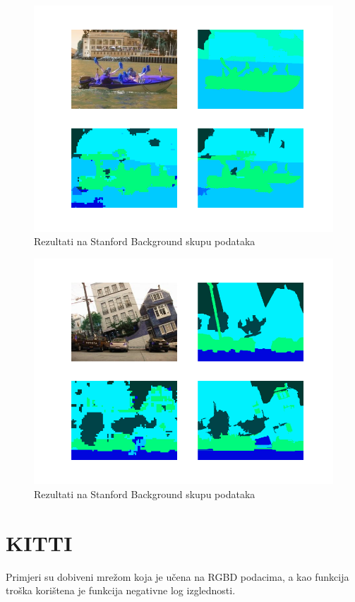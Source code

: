 \documentclass[times, utf8, diplomski, numeric]{fer}
\begin{document}
\begin{figure}[H]
  \centering
  \includegraphics[width=\textwidth]{imgs/iccv-sampl2.png}
  \caption{Rezultati na Stanford Background skupu podataka}
\end{figure}

\begin{figure}[H]
  \centering
  \includegraphics[width=\textwidth]{imgs/iccv-sampl3.png}
  \caption{Rezultati na Stanford Background skupu podataka}
\end{figure}

\section{KITTI}
Primjeri su dobiveni mrežom koja je učena na RGBD podacima, a kao funkcija troška korištena je funkcija negativne log izglednosti.
\end{document}

